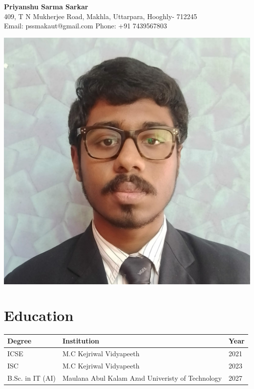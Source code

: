 \documentclass[a4paper,10pt]{article}
\begin{document}
\begin{center}
    {\LARGE \textbf{Priyanshu Sarma Sarkar}} \\
    409, T N Mukherjee Road, Makhla, Uttarpara, Hooghly- 712245 \\
    Email: pssmakaut@gmail.com \quad Phone: +91 7439567803
\end{center}

\vspace{0 pt}

\begin{flushright}
    \includegraphics[scale=0.08]{pic.jpeg}
\end{flushright}



\section*{Education}
\begin{tabular}{|p{}|p{}|p{}|}
\hline
\textbf{Degree} & \textbf{Institution} & \textbf{Year} \\
\hline
ICSE & M.C Kejriwal Vidyapeeth & 2021 \\
\hline
ISC & M.C Kejriwal Vidyapeeth & 2023 \\
\hline
B.Sc. in IT (AI) & Maulana Abul Kalam Azad Univeristy of Technology & 2027 \\
\hline
\end{tabular}
\end{document}
